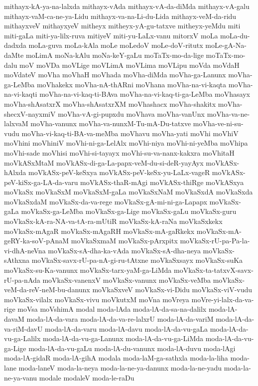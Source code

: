{mithayx-kA-ya-na-lalxda
mithayx-vAda
mithayx-vA-da-diMda
mithayx-vA-galu
mithayx-vaM-ca-ne-ya-Lidu
mithayx-va-na-Li-du-Lida
mithayx-veM-da-ridu
mithayxveV
mithayxyeV
mitheyx
mitheyx-yA-gu-tatxve
mitheyx-yeMdu
miti
miti-gaLa
miti-ya-lilx-ruva
mitiyeV
miti-yu-LaLx-vanu
mitorxV
moLa
moLa-du-dadxda
moLa-guva
moLa-kAla
moLe
moLedoV
moLe-doV-ritutx
moLe-gA-Na-daMte
moLimA
moNa-kAlu
moNa-keY-gaLu
moTaTx-mo-da-lige
moTaTx-mo-dalu
moV
moVDa
moVLige
moVLimA
moVLima
moVLipu
moVda
moVdaH
moVdateV
moVha
moVhaH
moVhada
moVha-diMda
moVha-ga-Lanunx
moVha-ga-LeMba
moVhakekx
moVha-nA-thARni
moVhana
moVha-na-vi-kaqta
moVha-na-vi-kaqti
moVha-na-vi-kaq-ti-BAva
moVha-na-vi-kaq-ti-ga-LeMba
moVhasayx
moVha-shAsatxrX
moVha-shAsatxrXM
moVhashacx
moVha-shakitx
moVha-shecxV-nayxmiV
moVha-vA-gi-pupxdu
moVhava
moVha-vanUnx
moVha-va-ne-lalxvaM
moVha-vanunx
moVha-va-nunxM-Tu-mA-Du-tatxve
moVha-ve-ni-su-vudu
moVha-vi-kaq-ti-BA-va-meMba
moVhavu
moVha-yati
moVhi
moVhiV
moVhini
moVhiniV
moVhi-ni-ga-LelAlx
moVhi-niya
moVhi-ni-yeMba
moVhipa
moVhi-sade
moVhisi
moVhi-si-tayayx
moVhi-su-va-nanx-kakxra
moVhitaH
moVkASxMtaM
moVkASx-di-ga-La-papx-veM-du-si-deR-yayAyx
moVkASx-hAlxda
moVkASx-peV-keSxya
moVkASx-peV-keSx-yu-LaLx-vageR
moVkASx-peV-kiSx-ga-LA-da-varu
moVkASx-thaR-mAgi
moVkASx-thiRge
moVkASxya
moVkaSx
moVkaSxM
moVkaSxM-gaLa
moVkaSxNaM
moVkaSxdA
moVkaSxda
moVkaSxdaM
moVkaSx-da-va-rege
moVkaSx-gA-mi-ni-ga-Lapapx
moVkaSx-gaLa
moVkaSx-ga-LeMba
moVkaSx-ga-Lige
moVkaSx-gaLu
moVkaSx-guru
moVkaSx-kA-ra-NA-va-tA-ra-mUtiR
moVkaSx-kA-raNa
moVkaSxkekx
moVkaSx-mAgaR
moVkaSx-mAgaRH
moVkaSx-mA-gaRkekx
moVkaSx-mA-geRY-ka-soV-pAnaM
moVkaSxmaM
moVkaSx-pArxpitx
moVkaSx-rU-pa-Pa-la-vi-dhA-neVna
moVkaSx-sA-dha-ka-vAda
moVkaSx-sA-dha-neya
moVkaSx-sAthxna
moVkaSx-savx-rU-pa-nA-gi-ru-tAtxne
moVkaSxsayx
moVkaSx-suKa
moVkaSx-su-Ka-vanunx
moVkaSx-tarx-yaM-ga-LiMda
moVkaSx-ta-tatxvX-savx-rU-pa-nAda
moVkaSx-vanenxV
moVkaSx-vanunx
moVkaSx-veMba
moVkaSx-veM-da-reV-neM-bu-danunx
moVkaSxveV
moVkaSx-vi-Didu
moVkaSx-viV-vudu
moVkaSx-vilalx
moVkaSx-vivu
moVkutxM
moVna
moVreya
moVre-yi-lalx-da-va-rige
moVsa
moVshimA
modal
moda-lAda
moda-lA-da-sa-na-dalilx
moda-lA-davaM
moda-lA-da-vara
moda-lA-da-va-re-lalxrU
moda-lA-da-variM
moda-lA-da-va-riM-davU
moda-lA-da-varu
moda-lA-davu
moda-lA-da-vu-gaLa
moda-lA-da-vu-ga-Lalilx
moda-lA-da-vu-ga-Lanunx
moda-lA-da-vu-ga-LiMda
moda-lA-da-vu-ga-Lige
moda-lA-da-vu-gaLu
moda-lA-du-vanunx
moda-lA-duvu
moda-lAgi
moda-lA-gidaR
moda-lA-gihA
modala
moda-laM-ga-sathxla
moda-la-liha
moda-lane
moda-laneV
moda-la-neya
moda-la-ne-ya-danunx
moda-la-ne-yadu
moda-la-ne-ya-vanu
modale
modaleV
moda-le-raDu
}

